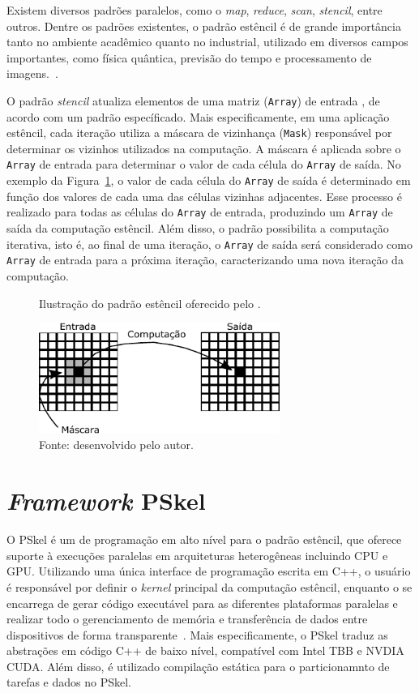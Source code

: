 Existem diversos padrões paralelos, como o \textit{map}, \textit{reduce},
\textit{scan}, \textit{stencil}, entre outros. Dentre os padrões existentes, o
padrão estêncil é de grande importância tanto no ambiente acadêmico quanto no
industrial, utilizado em diversos campos importantes, como física quântica,
previsão do tempo e processamento de imagens.~\cite{pereira15}.


O padrão \textit{stencil} atualiza elementos de uma matriz (\texttt{Array}) de entrada
, de acordo com um padrão específicado. Mais especificamente, em uma aplicação
estêncil, cada iteração utiliza a máscara de vizinhança (\texttt{Mask})
responsável por determinar os vizinhos utilizados na computação. A máscara é
aplicada sobre o \texttt{Array} de entrada para determinar o valor de cada
célula do \texttt{Array} de saída. No exemplo da Figura~\ref{fig:stencil}, o
valor de cada célula do \texttt{Array} de saída é determinado em função dos
valores de cada uma das células vizinhas adjacentes. Esse processo é realizado
para todas as células do \texttt{Array} de entrada, produzindo um \texttt{Array}
de saída da computação estêncil. Além disso, o padrão possibilita a computação
iterativa, isto é, ao final de uma iteração, o \texttt{Array} de saída será
considerado como \texttt{Array} de entrada para a próxima iteração,
caracterizando uma nova iteração da computação.

\begin{figure}[t]
	\centering
	\caption{Ilustração do padrão estêncil oferecido pelo \pskel.}
	\includegraphics[width=0.7\textwidth]{figs/stencilComp.pdf}
    \caption*{Fonte: desenvolvido pelo autor.}
	\label{fig:stencil}
\end{figure}



\section{\textit{Framework} PSkel}
O PSkel é um \fw de programação em alto nível para o padrão estêncil, que
oferece suporte à execuções paralelas em arquiteturas heterogêneas incluindo CPU
e GPU. Utilizando uma única interface de programação escrita em C++, o usuário é
responsável por definir o \textit{kernel} principal da computação estêncil,
enquanto o \fw se encarrega de gerar código executável para as diferentes
plataformas paralelas e realizar todo o gerenciamento de memória e transferência
de dados entre dispositivos de forma transparente~\cite{pereira15}. Mais
especificamente, o PSkel traduz as abstrações em código C++ de baixo nível,
compatível com Intel TBB e NVDIA CUDA. Além disso, é utilizado compilação
estática para o particionamnto de tarefas e dados no PSkel.

